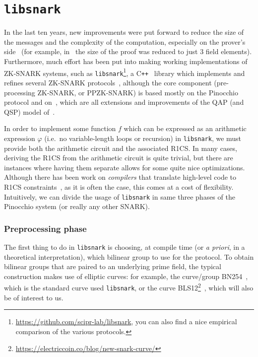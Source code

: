 \section{\texttt{libsnark}}\label{sec:libsnark}
In the last ten years, new improvements were put forward to reduce the size of the messages and 
the complexity of the computation, especially on the prover's side~\cite{Lipmaa2013} (for example, 
in~\cite{Groth2016} the size of the proof was reduced to just \(3\) field elements).
Furthermore, much effort has been put into making working implementations of ZK-SNARK 
systems, such as \texttt{libsnark}\footnote{\url{https://github.com/scipr-lab/libsnark}, you can 
also find a nice empirical comparison of the various protocols.}, 
a C\texttt{++}~\cite{Stroustrup2013} library which implements and refines several ZK-SNARK 
protocols~\cite{DanezisFGK2014,GrothM2017,BackesBFR2014,SassonCGTV2013}, although the core 
component (pre-processing ZK-SNARK, or PPZK-SNARK) is based mostly on the Pinocchio protocol and 
on~\cite{SassonCTV2013,Groth2016}, which are all extensions and improvements of the QAP (and QSP) 
model of~\cite{GennaroGPR2012}.

In order to implement some function \(f\) which can be expressed as an 
arithmetic expression \(\varphi \) (i.e.\ no variable-length loops or recursion) in 
\texttt{libsnark}, we must provide both the arithmetic circuit and the associated R1CS\@.
In many cases, deriving the R1CS from the arithmetic circuit is quite trivial, but there are 
instances where having them separate allows for some quite nice optimizations.
Although there has been work on \emph{compilers} that translate high-level code to R1CS 
constraints~\cite{EberhardtT2018,BellesBDM2022}, as it is often the case, this comes at a cost 
of flexibility.
Intuitively, we can divide the usage of \texttt{libsnark} in same three phases of the Pinocchio 
system (or really any other SNARK).

\subsubsection*{Preprocessing phase}
The first thing to do in \texttt{libsnark} is choosing, at compile time (or \emph{a priori}, in a 
theoretical interpretation), which bilinear group to use for the protocol. 
To obtain bilinear groups that are paired to an underlying prime field, the typical construction 
makes use of elliptic curves: for example, the curve/group BN254~\cite{BarretoN2005}, which is the 
standard curve used \texttt{libsnark}, or the curve
BLS12\footnote{\url{https://electriccoin.co/blog/new-snark-curve/}}~\cite{BonehLS2001}, which 
will also be of interest to us.

